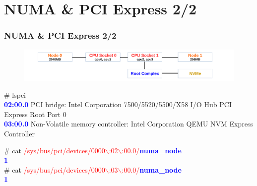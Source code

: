 \documentclass[aspectratio=169]{beamer}
\begin{document}
\section{NUMA \& PCI Express 2/2}
\begin{frame}
\frametitle{NUMA \& PCI Express 2/2}
\begin{figure}
\includegraphics[width=1.0\linewidth]{figures/numa-pcie.pdf}
\end{figure}
\begin{block}{}
\# lspci \\
\textbf{\textcolor{blue}{02:00.0}} PCI bridge: Intel Corporation 7500/5520/5500/X58 I/O Hub PCI Express Root Port 0 \\
\textbf{\textcolor{blue}{03:00.0}} Non-Volatile memory controller: Intel Corporation QEMU NVM Express Controller \newline

\# cat \textcolor{red}{/sys/bus/pci/devices/0000$\backslash$:02$\backslash$:00.0/\textbf{\textcolor{blue}{numa\_node}}} \\
\textbf{\textcolor{blue}{1}} \\
\# cat \textcolor{red}{/sys/bus/pci/devices/0000$\backslash$:03$\backslash$:00.0/\textbf{\textcolor{blue}{numa\_node}}} \\
\textbf{\textcolor{blue}{1}}
\end{block}
\end{frame}

\end{document}
